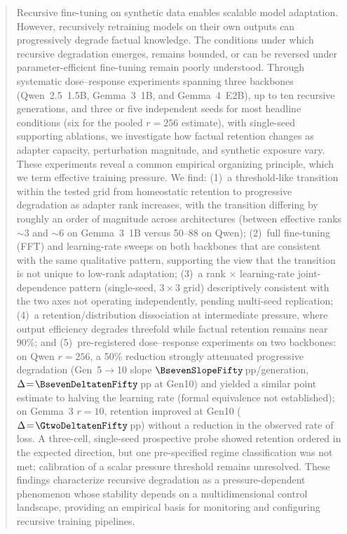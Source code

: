\documentclass[a4paper,fleqn]{cas-dc}
\newif\ifshowchanges
\newcommand{\rev}[1]{\ifshowchanges{\color{blue}#1}\else{#1}\fi}
\begin{document}
\begin{abstract}
Recursive fine-tuning on synthetic data enables scalable model adaptation.
However, recursively retraining models on their own outputs can progressively
degrade factual knowledge. The conditions under which recursive degradation
emerges, remains bounded, or can be reversed under parameter-efficient
fine-tuning remain poorly understood.
\rev{Through systematic dose--response experiments spanning three backbones
(Qwen~2.5~1.5B, Gemma~3~1B, and Gemma~4~E2B), up to ten recursive
generations, and three or five independent seeds for most headline
conditions (six for the pooled $r=256$ estimate), with single-seed
supporting ablations, we investigate how factual retention changes as
adapter capacity, perturbation magnitude, and synthetic exposure vary.}
These experiments reveal a common empirical organizing principle, which we
term effective training pressure. We find:
(1)~\rev{a threshold-like transition within the tested grid} from homeostatic
retention to progressive degradation as adapter rank increases, with the
transition differing by roughly an order of magnitude across architectures
(between effective ranks ${\sim}3$ and ${\sim}6$ on Gemma~3~1B versus 50--88 on Qwen);
(2)~\rev{full fine-tuning (FFT) and} learning-rate sweeps on both backbones
that are consistent with the same qualitative pattern, supporting the view
that the transition is not unique to low-rank adaptation;
(3)~a rank $\times$ learning-rate \rev{joint-dependence pattern (single-seed, $3{\times}3$ grid) descriptively consistent with the two axes not operating independently, pending multi-seed replication};
(4)~a retention/distribution dissociation at intermediate pressure, where
output efficiency degrades threefold while factual retention remains near 90\%;
and (5)~\rev{pre-registered dose--response experiments on two backbones:
on Qwen $r=256$, a 50\% reduction strongly attenuated progressive degradation
(Gen~5$\to$10 slope $\BsevenSlopeFifty$\,pp/generation,
$\Delta\!=\!\BsevenDeltatenFifty$\,pp at Gen10) and yielded a similar point
estimate to halving the learning rate (formal equivalence not established);
on Gemma~3 $r=10$, retention improved at Gen10
($\Delta\!=\!\GtwoDeltatenFifty$\,pp) without a reduction in the observed rate of loss.}
\rev{A three-cell, single-seed prospective probe showed retention ordered in the expected direction, but one pre-specified regime classification was not met; calibration of a scalar pressure threshold remains unresolved.}
These findings characterize recursive degradation as a pressure-dependent
phenomenon whose stability depends on a multidimensional control landscape,
providing an empirical basis for monitoring and configuring recursive training
pipelines.
\end{abstract}
\end{document}
